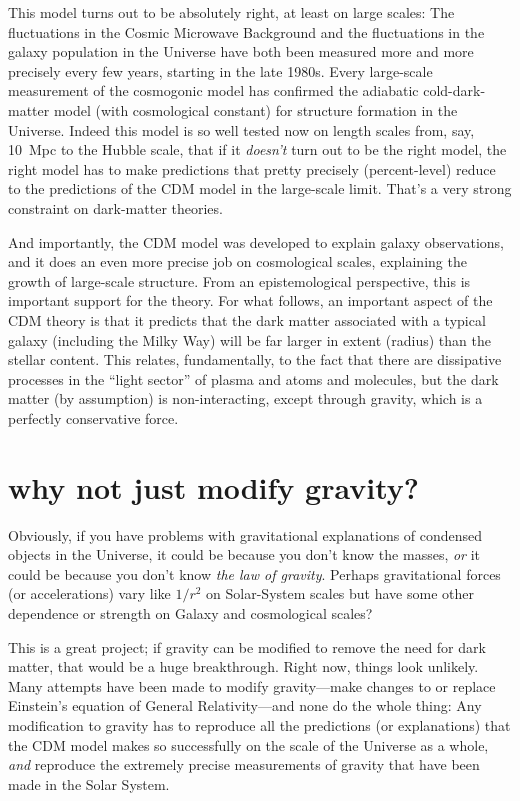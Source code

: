 \documentclass[12pt]{article}
\begin{document}
This model turns out to be absolutely right, at least on large scales:
The fluctuations in the Cosmic Microwave Background and the
fluctuations in the galaxy population in the Universe have both been
measured more and more precisely every few years, starting in the late
1980s.  Every large-scale measurement of the cosmogonic model has
confirmed the adiabatic cold-dark-matter model (with cosmological
constant) for structure formation in the Universe.  Indeed this model
is so well tested now on length scales from, say, 10~Mpc to the Hubble
scale, that if it \emph{doesn't} turn out to be the right model, the
right model has to make predictions that pretty precisely
(percent-level) reduce to the predictions of the CDM model in the
large-scale limit.  That's a very strong constraint on dark-matter
theories.

And importantly, the CDM model was developed to explain galaxy
observations, and it does an even more precise job on cosmological
scales, explaining the growth of large-scale structure.  From an
epistemological perspective, this is important support for the theory.
For what follows, an important aspect of the CDM theory is that it
predicts that the dark matter associated with a typical galaxy
(including the Milky Way) will be far larger in extent (radius) than
the stellar content.  This relates, fundamentally, to the fact that
there are dissipative processes in the ``light sector'' of plasma and
atoms and molecules, but the dark matter (by assumption) is
non-interacting, except through gravity, which is a perfectly
conservative force.

\section{why not just modify gravity?}

Obviously, if you have problems with gravitational explanations of
condensed objects in the Universe, it could be because you don't know
the masses, \emph{or} it could be because you don't know \emph{the law
  of gravity}.  Perhaps gravitational forces (or accelerations) vary
like $1/r^2$ on Solar-System scales but have some other dependence or
strength on Galaxy and cosmological scales?

This is a great project; if gravity can be modified to remove the need
for dark matter, that would be a huge breakthrough.  Right now, things
look unlikely.  Many attempts have been made to modify gravity---make
changes to or replace Einstein's equation of General Relativity---and
none do the whole thing: Any modification to gravity has to reproduce
all the predictions (or explanations) that the CDM model makes so
successfully on the scale of the Universe as a whole, \emph{and}
reproduce the extremely precise measurements of gravity that have been
made in the Solar System.
\end{document}
